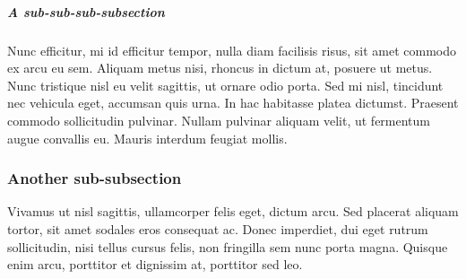 \documentclass{article}
\begin{document}
\subparagraph{A sub-sub-sub-subsection}
\label{subparagraph: A sub-sub-sub-subsection}

Nunc efficitur, mi id efficitur tempor, nulla diam facilisis risus, sit amet commodo ex arcu eu sem. Aliquam metus nisi, rhoncus in dictum at, posuere ut metus. Nunc tristique nisl eu velit sagittis, ut ornare odio porta. Sed mi nisl, tincidunt nec vehicula eget, accumsan quis urna. In hac habitasse platea dictumst. Praesent commodo sollicitudin pulvinar. Nullam pulvinar aliquam velit, ut fermentum augue convallis eu. Mauris interdum feugiat mollis.


\subsubsection{Another sub-subsection}
\label{subsubsec: Another sub-subsection}

Vivamus ut nisl sagittis, ullamcorper felis eget, dictum arcu. Sed placerat aliquam tortor, sit amet sodales eros consequat ac. Donec imperdiet, dui eget rutrum sollicitudin, nisi tellus cursus felis, non fringilla sem nunc porta magna. Quisque enim arcu, porttitor et dignissim at, porttitor sed leo.





\clearpage



\end{document}

